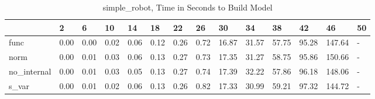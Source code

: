 \begin{table}
\caption{simple_robot, Time in Seconds to Build Model}
\label{simple_robot_model_time}
\begin{tabular}{llllllllllllll}
\toprule
 & 2 & 6 & 10 & 14 & 18 & 22 & 26 & 30 & 34 & 38 & 42 & 46 & 50 \\
\midrule
func & 0.00 & 0.00 & 0.02 & 0.06 & 0.12 & 0.26 & 0.72 & 16.87 & 31.57 & 57.75 & 95.28 & 147.64 & - \\
norm & 0.00 & 0.01 & 0.03 & 0.06 & 0.13 & 0.27 & 0.73 & 17.35 & 31.27 & 58.75 & 95.86 & 150.66 & - \\
no_internal & 0.00 & 0.01 & 0.03 & 0.05 & 0.13 & 0.27 & 0.74 & 17.39 & 32.22 & 57.86 & 96.18 & 148.06 & - \\
s_var & 0.00 & 0.01 & 0.02 & 0.06 & 0.13 & 0.26 & 0.82 & 17.33 & 30.99 & 59.21 & 97.32 & 144.72 & - \\
\bottomrule
\end{tabular}
\end{table}
